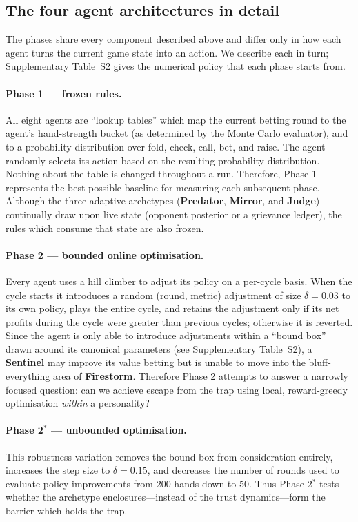 \documentclass[journal]{IEEEtran}
\newcommand{\arch}[1]{\textbf{#1}}
\begin{document}

\subsection{The four agent architectures in detail}
The phases share every component described above and differ only in
how each agent turns the current game state into an action. We
describe each in turn; Supplementary Table~S2 gives the
numerical policy that each phase starts from.

\paragraph{Phase 1 --- frozen rules.} All eight agents are ``lookup tables'' which map the current betting
round to the agent's hand-strength bucket (as determined by the Monte Carlo
evaluator), and to a probability distribution over fold, check, call, bet, and
raise. The agent randomly selects its action based on the resulting probability
distribution. Nothing about the table is changed throughout a run. Therefore,
Phase 1 represents the best possible baseline for measuring each subsequent
phase. Although the three adaptive archetypes (\arch{Predator}, \arch{Mirror},
and \arch{Judge}) continually draw upon live state (opponent posterior or a
grievance ledger), the rules which consume that state are also frozen.

\paragraph{Phase 2 --- bounded online optimisation.} Every agent uses a hill climber to adjust its policy on a per-cycle basis.
When the cycle starts it introduces a random (round, metric) adjustment of size
$\delta = 0.03$ to its own policy, plays the entire cycle, and retains the
adjustment only if its net profits during the cycle were greater than previous
cycles; otherwise it is reverted. Since the agent is only able to introduce
adjustments within a ``bound box'' drawn around its canonical parameters (see
Supplementary Table~S2), a \arch{Sentinel} may improve its
value betting but is unable to move into the bluff-everything area of
\arch{Firestorm}. Therefore Phase 2 attempts to answer a narrowly focused
question: can we achieve escape from the trap using local, reward-greedy
optimisation \emph{within} a personality?

\paragraph{Phase 2$^{*}$ --- unbounded optimisation.} This robustness variation removes the bound box from consideration entirely,
increases the step size to $\delta = 0.15$, and decreases the number of rounds
used to evaluate policy improvements from 200 hands down to 50. Thus
Phase 2$^{*}$ tests whether the archetype enclosures---instead of the trust
dynamics---form the barrier which holds the trap.
\end{document}
